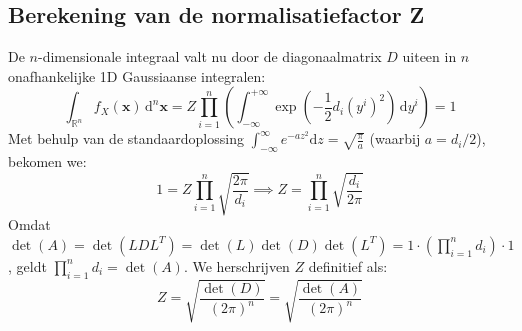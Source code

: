 \documentclass{article}
\begin{document}
\subsection*{Berekening van de normalisatiefactor Z}
De $n$-dimensionale integraal valt nu door de diagonaalmatrix $D$ uiteen in $n$ onafhankelijke 1D Gaussiaanse integralen:
\begin{equation}
    \int_{\mathbb{R}^n} f_X(\mathbf{x}) \, \mathrm{d}^n\mathbf{x} = Z \prod_{i=1}^n \left( \int_{-\infty}^{+\infty} \exp\left(-\frac{1}{2} d_i (y^i)^2\right) \, \mathrm{d}y^i \right) = 1
\end{equation}
Met behulp van de standaardoplossing $\int_{-\infty}^{\infty} e^{-a z^2} \mathrm{d}z = \sqrt{\frac{\pi}{a}}$ (waarbij $a = d_i / 2$), bekomen we:
\begin{equation}
    1 = Z \prod_{i=1}^n \sqrt{\frac{2\pi}{d_i}} \implies Z = \prod_{i=1}^n \sqrt{\frac{d_i}{2\pi}}
\end{equation}
Omdat $\det(A) = \det(L D L^T) = \det(L)\det(D)\det(L^T) = 1 \cdot \left(\prod_{i=1}^n d_i\right) \cdot 1$, geldt $\prod_{i=1}^n d_i = \det(A)$. We herschrijven $Z$ definitief als:
\begin{equation}
    Z = \sqrt{\frac{\det(D)}{(2\pi)^n}} = \sqrt{\frac{\det(A)}{(2\pi)^n}}
\end{equation}
\end{document}
